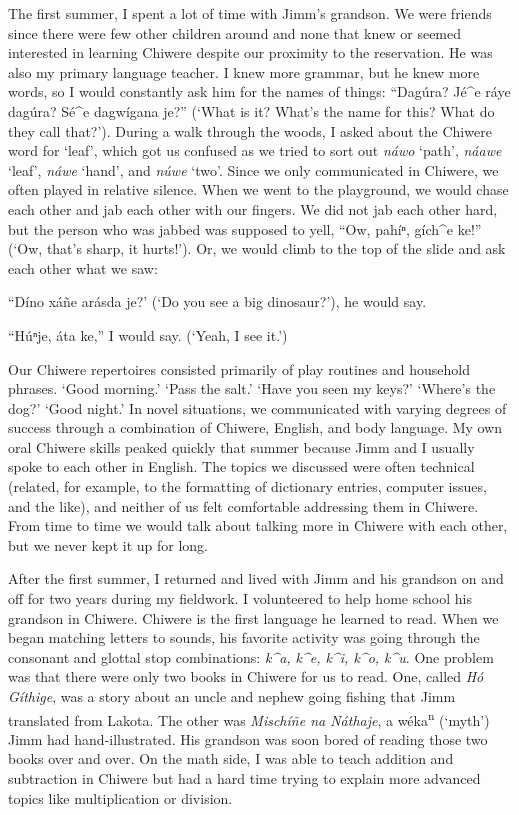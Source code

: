 \documentclass[output=paper]{LSP/langsci}
\begin{document}
The first summer, I spent a lot of time with Jimm's grandson. We were friends since there were few other children around and none that knew or seemed interested in learning Chiwere despite our proximity to the reservation. He was also my primary language teacher. I knew more grammar, but he knew more words, so I would constantly ask him for the names of things: ``Dag\'ura? J\'e\^{ }e r\'aye dag\'ura? S\'e\^{ }e dagw\'igana je?'' (`What is it? What's the name for this? What do they call that?'). During a walk through the woods, I asked about the Chiwere word for `leaf', which got us confused as we tried to sort out \emph{n\'awo} `path', \emph{n\'aawe} `leaf', \emph{n\'awe} `hand', and \emph{n\'uwe} `two'. Since we only communicated in Chiwere, we often played in relative silence. When we went to the playground, we would chase each other and jab each other with our fingers. We did not jab each other hard, but the person who was jabbed was supposed to yell, ``Ow, pah\'iⁿ, g\'ich\^{ }e ke!'' (`Ow, that's sharp, it hurts!'). Or, we would climb to the top of the slide and ask each other what we saw:

	``D\'ino x\'a\~ne ar\'asda je?' (`Do you see a big dinosaur?'), he would say.
	
	``H\'uⁿje, \'ata ke,'' I would say. (`Yeah, I see it.')

Our Chiwere repertoires consisted primarily of play routines and household phrases. `Good morning.' `Pass the salt.' `Have you seen my keys?' `Where's the dog?' `Good night.' In novel situations, we communicated with varying degrees of success through a combination of Chiwere, English, and body language. My own oral Chiwere skills peaked quickly that summer because Jimm and I usually spoke to each other in English. The topics we discussed were often technical (related, for example, to the formatting of dictionary entries, computer issues, and the like), and neither of us felt comfortable addressing them in Chiwere. From time to time we would talk about talking more in Chiwere with each other, but we never kept it up for long.

After the first summer, I returned and lived with Jimm and his grandson on and off for two years during my fieldwork. I volunteered to help home school his grandson in Chiwere. Chiwere is the first language he learned to read. When we began matching letters to sounds, his favorite activity was going through the consonant and glottal stop combinations: \emph{k\^{ }a, k\^{ }e, k\^{ }i, k\^{ }o, k\^{ }u}. One problem was that there were only two books in Chiwere for us to read. One, called \emph{H\'o G\'ithige}, was a story about an uncle and nephew going fishing that Jimm translated from Lakota. The other was \emph{Misch\'i\~ne na N\'athaje}, a w\'eka\textsuperscript{n} (`myth') Jimm had hand-illustrated. His grandson was soon bored of reading those two books over and over. On the math side, I was able to teach addition and subtraction in Chiwere but had a hard time trying to explain more advanced topics like multiplication or division.
\end{document}
